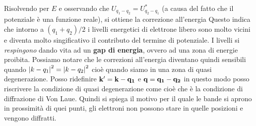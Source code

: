 Risolvendo per $E$ e osservando che $U_{q_1-q_2} = U^*_{q_2-q_1}$ (a causa del fatto che il potenziale è una funzione reale), si ottiene la correzione all'energia
Questo indica che intorno a $(q_1+q_2)/2$ i livelli energetici di elettrone libero sono molto vicini e diventa molto singificativo il contributo del termine di potenziale. I livelli si \textit{respingono} dando vita ad un \textbf{gap di energia}, ovvero ad una zona di energie proibita. Possiamo notare che le correzioni all'energia diventano quindi sensibili quando $\abs{k-q_1} ^2 = \abs{k-q_2} ^2$ cioè quando siamo in una zona di quasi degenerazione. Posso ridefinire ${\it\bf k'} = \it\bf k - \it\bf q_1$ e $\it\bf q = \it\bf q_1 - \it\bf q_2$ in questo modo posso riscrivere la condizione di quasi degenerazione come
cioè 
che è la condizione di diffrazione di Von Laue. Quindi si spiega il motivo per il quale le bande si aprono in prossimità di quei punti, gli elettroni non possono stare in quelle posizioni e vengono diffratti.
